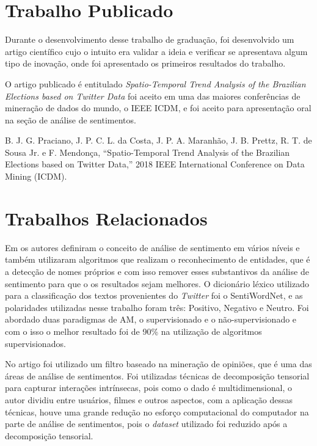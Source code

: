 \section{Trabalho Publicado}

Durante o desenvolvimento desse trabalho de graduação, foi desenvolvido um artigo científico cujo o intuito era validar a ideia e verificar se apresentava
algum tipo de inovação, onde foi apresentado os primeiros resultados do trabalho. 

O artigo publicado é entitulado \textit{Spatio-Temporal Trend Analysis of the Brazilian Elections based on Twitter Data} foi aceito em uma das maiores
conferências de mineração de dados do mundo, o \acrshort{IEEE} \acrshort{ICDM}, e foi aceito para apresentação oral na seção de análise de sentimentos.

B. J. G. Praciano, J. P. C. L. da Costa, J. P. A. Maranhão, J. B. Prettz, R. T. de Sousa Jr. e F. Mendonça, “Spatio-Temporal Trend Analysis of the Brazilian Elections based on Twitter Data,”  2018 IEEE International Conference on Data Mining (ICDM).


\section{Trabalhos Relacionados}

Em \cite{8474783} os autores definiram o conceito de análise de sentimento em vários níveis e também utilizaram algoritmos que realizam o reconhecimento de entidades, que é
a detecção de nomes próprios e com isso remover esses substantivos da análise de sentimento para que o os resultados sejam melhores. O dicionário léxico utilizado para a classificação
dos textos provenientes do \textit{Twitter} foi o SentiWordNet, e as polaridades utilizadas nesse trabalho foram três: Positivo, Negativo e Neutro. Foi abordado duas paradigmas
de \acrshort{AM}, o supervisionado e o não-supervisionado e com o isso o melhor resultado foi de 90\% na utilização de algoritmos supervisionados.


No artigo \cite{6413737} foi utilizado um filtro baseado na mineração de opiniões, que é uma das áreas de análise de sentimentos. Foi utilizadas técnicas de decomposição 
tensorial para capturar interações intrínsecas, pois como o dado é multidimensional, o autor dividiu entre usuários, filmes e outros aspectos, com a aplicação dessas técnicas,
houve uma grande redução no esforço computacional do computador na parte de análise de sentimentos, pois o \textit{dataset} utilizado foi reduzido após a decomposição tensorial.



